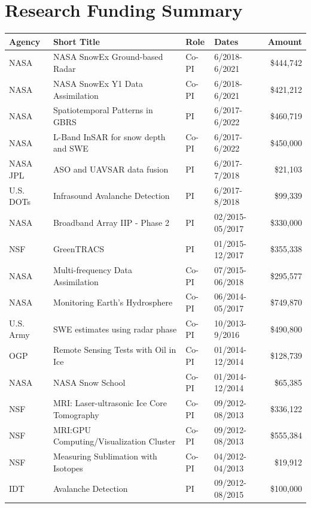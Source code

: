 \documentclass[11pt]{article}
\renewcommand\arraystretch{1}
\begin{document}
\pagebreak


\begin{table}[!htbp]
\section*{Research Funding Summary}
\renewcommand\arraystretch{0.7}
  \centering
  \begin{tabular}{|l|l|l|l|r|}
\hline
\textbf{Agency} & \textbf{Short Title} & \textbf{Role} & \textbf{Dates} & \textbf{Amount} \\ \hline \hline
NASA & NASA SnowEx Ground-based Radar & Co-PI & 6/2018-6/2021 &  \$444,742 \\ \hline
NASA & NASA SnowEx Y1 Data Assimilation & Co-PI & 6/2018-6/2021 &  \$421,212 \\ \hline
NASA & Spatiotemporal Patterns in GBRS & PI & 6/2017-6/2022 & \$460,719 \\ \hline
NASA & L-Band InSAR for snow depth and SWE & Co-PI & 6/2017-6/2022 & \$450,000 \\ \hline
NASA JPL & ASO and UAVSAR data fusion & PI &  6/2017-7/2018 & \$21,103 \\ \hline
U.S. DOTs & Infrasound Avalanche Detection & PI & 6/2017-8/2018 &  \$99,339 \\ \hline
NASA & Broadband Array IIP - Phase 2 & PI & 02/2015-05/2017 & \$330,000 \\ \hline
NSF & GreenTRACS & PI & 01/2015-12/2017 & \$355,338 \\ \hline
NASA & Multi-frequency Data Assimilation & Co-PI & 07/2015-06/2018 & \$295,577 \\ \hline
NASA & Monitoring Earth's Hydrosphere & Co-PI & 06/2014-05/2017 &  \$749,870  \\ \hline
U.S. Army & SWE estimates using radar phase & Co-PI & 10/2013- 9/2016 & \$490,800 \\ \hline
OGP & Remote Sensing Tests with Oil in Ice & Co-PI & 01/2014-12/2014 & \$128,739 \\ \hline
NASA & NASA Snow School & Co-PI & 01/2014-12/2014 & \$65,385 \\ \hline
NSF & MRI: Laser-ultrasonic Ice Core Tomography & Co-PI & 09/2012-08/2013 & \$336,122 \\ \hline
NSF & MRI:GPU Computing/Visualization Cluster & Co-PI & 09/2012-08/2013 & \$555,384 \\ \hline
NSF & Measuring Sublimation with Isotopes & Co-PI & 04/2012-04/2013 & \$19,912 \\ \hline
IDT & Avalanche Detection & PI & 09/2012-08/2015 & \$100,000 \\ \hline

\end{tabular}
\end{table}
\end{document}
